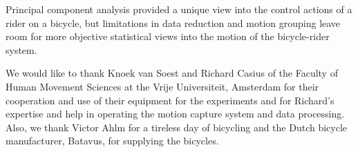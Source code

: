 \documentclass[smallextended]{svjour3}     %
\begin{document}
Principal component analysis provided a unique view
into the control actions of a rider on a bicycle, but limitations in data
reduction and motion grouping leave room for more objective statistical
views into the motion of the bicycle-rider system.
\begin{acknowledgements}
We would like to thank Knoek van Soest and Richard Casius of the Faculty of
Human Movement Sciences at the Vrije Universiteit, Amsterdam for their cooperation and use
of their equipment for the experiments and for Richard's expertise and help in
operating the motion capture system and data processing. Also, we thank Victor Ahlm for
a tireless day of bicycling and the Dutch bicycle manufacturer, Batavus, for supplying the bicycles.
\end{acknowledgements}

\end{document}
